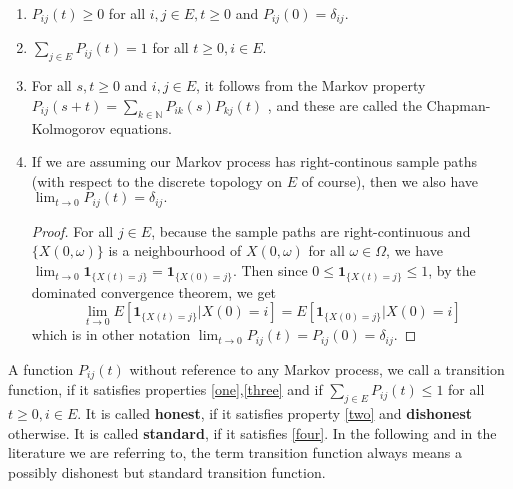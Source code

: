 \documentclass[12pt,a4paper]{scrartcl}
\numberwithin{equation}{section}
\newcommand{\N}{\mathbb{N}} %
\begin{document}
\begin{enumerate}[(1)]
\item \label{one} $ P_{ij}\left(t\right) \geq 0 $ for all $i,j \in E , t \geq 0 $ and $ P_{ij}\left(0\right) = \delta_{ij}. $ \label{one}

\item \label{two} $ \sum_{j \in E} P_{ij}\left(t\right) = 1 $ for all  $ t \geq 0, i \in E $. \label{two}
\item \label{three} For all $s,t \geq 0 $ and $ i,j \in E $, it follows from the Markov property $ P_{ij}\left(s+t\right) = \sum_{k \in \N} P_{ik}\left(s\right) P_{kj}\left(t\right) $ , and these are called the Chapman-Kolmogorov equations. \label{three}

\item \label{four} If we are assuming our Markov process has right-continous sample paths (with respect to the discrete topology on $E$ of course), then we also have  $ \lim_{t \to 0} P_{ij}\left(t\right) = \delta_{ij}. $ \label{four}
\begin{proof}
For all $ j \in E $, because the sample paths are right-continuous and $ \lbrace X\left(0, \omega\right) \rbrace $ is a neighbourhood of $X\left(0, \omega\right)$ for all $ \omega \in \Omega $, we have $ \lim_{t \to 0} \textbf{1}_{\lbrace X\left(t\right)=j\rbrace } = \textbf{1}_{\lbrace X\left(0\right)=j\rbrace } $. Then since $ 0 \leq \textbf{1}_{\lbrace X\left(t\right)=j\rbrace } \leq 1 $, by the dominated convergence theorem, we get 
$$ \lim_{t \to 0} E\left[\textbf{1}_{\lbrace X\left(t\right)=j\rbrace } | X\left(0\right) = i \right] = E\left[\textbf{1}_{\lbrace X\left(0\right)=j\rbrace } | X\left(0\right) = i\right] $$ which is in other notation $ \lim_{t \to 0} P_{ij}\left(t\right) = P_{ij}\left(0\right) = \delta_{ij}. $
\end{proof}

\end{enumerate}

A function $ P_{ij}\left(t\right) $ without reference to any Markov process, we call a transition function, if it satisfies properties \eqref{one},\eqref{three} and if $ \sum_{j \in E} P_{ij}\left(t\right) \leq 1 $ for all  $ t \geq 0, i \in E. $ It is called \textbf{honest}, if it satisfies property \eqref{two} and \textbf{dishonest} otherwise. It is called \textbf{standard}, if it satisfies \eqref{four}. In the following and in the literature we are referring to, the term transition function always means a possibly dishonest but standard transition function. \\[2ex]
\end{document}
